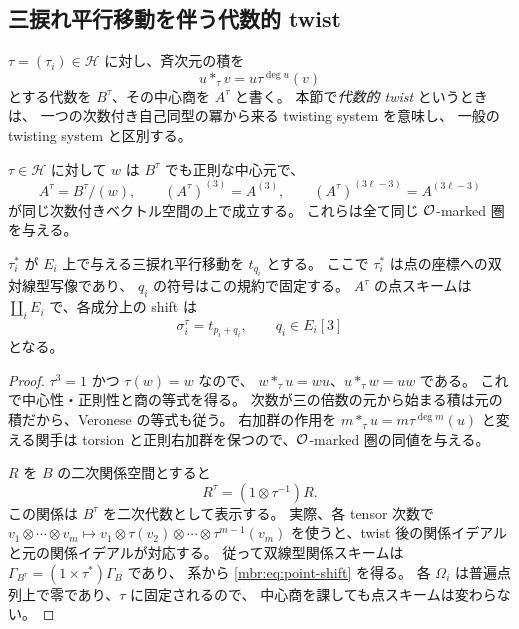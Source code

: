 \subsection{三捩れ平行移動を伴う代数的 twist}

$\tau=(\tau_i)\in\mathcal H$ に対し、斉次元の積を
\begin{equation}\label{mbr:eq:twist-product}
 u*_{\tau}v=u\tau^{\deg u}(v)
\end{equation}
とする代数を $B^\tau$、その中心商を $A^\tau$ と書く。
本節で\emph{代数的 twist} というときは、
一つの次数付き自己同型の冪から来る twisting system を意味し、
一般の twisting system と区別する。

\begin{lemma}
\label{mbr:lem:torsion-twist}
$\tau\in\mathcal H$ に対して $w$ は $B^\tau$ でも正則な中心元で、
\begin{equation}\label{mbr:eq:common-veronese}
 A^\tau=B^\tau/(w),\qquad
 (A^\tau)^{(3)}=A^{(3)},\qquad
 (A^\tau)^{(3\ell-3)}=A^{(3\ell-3)}
\end{equation}
が同じ次数付きベクトル空間の上で成立する。
これらは全て同じ $\mathcal O$-marked 圏を与える。

$\tau_i^*$ が $E_i$ 上で与える三捩れ平行移動を $t_{q_i}$ とする。
ここで $\tau_i^*$ は点の座標への双対線型写像であり、
$q_i$ の符号はこの規約で固定する。
$A^\tau$ の点スキームは $\coprod_iE_i$ で、各成分上の shift は
\begin{equation}\label{mbr:eq:point-shift}
 \sigma_i^\tau=t_{p_i+q_i},\qquad q_i\in E_i[3]
\end{equation}
となる。
\end{lemma}
\begin{proof}
$\tau^3=1$ かつ $\tau(w)=w$ なので、
$w*_{\tau}u=wu$、$u*_{\tau}w=uw$ である。
これで中心性・正則性と商の等式を得る。
次数が三の倍数の元から始まる積は元の積だから、Veronese の等式も従う。
右加群の作用を $m*_{\tau}u=m\tau^{\deg m}(u)$ と変える関手は
torsion と正則右加群を保つので、$\mathcal O$-marked 圏の同値を与える。

$R$ を $B$ の二次関係空間とすると
\begin{equation}\label{mbr:eq:twisted-relations}
 R^\tau=(1\otimes\tau^{-1})R.
\end{equation}
この関係は $B^\tau$ を二次代数として表示する。
実際、各 tensor 次数で
$v_1\otimes\cdots\otimes v_m\mapsto
v_1\otimes\tau(v_2)\otimes\cdots\otimes\tau^{m-1}(v_m)$
を使うと、twist 後の関係イデアルと元の関係イデアルが対応する。
従って双線型関係スキームは
$\Gamma_{B^\tau}=(1\times\tau^*)\Gamma_B$ であり、
系から \eqref{mbr:eq:point-shift} を得る。
各 $\Omega_i$ は普遍点列上で零であり、$\tau$ に固定されるので、
中心商を課しても点スキームは変わらない。
\end{proof}

